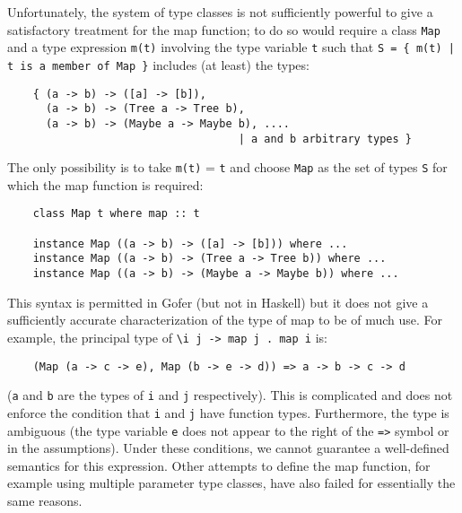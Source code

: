 Unfortunately, the system of type classes is not sufficiently powerful
to give a satisfactory treatment for the map function; to do so would
require a class \verb"Map" and a type expression \verb"m(t)" involving the type
variable \verb"t" such that \verb"S = { m(t) | t is a member of Map }" includes (at
least) the types:
\begin{verbatim}
    { (a -> b) -> ([a] -> [b]),
      (a -> b) -> (Tree a -> Tree b),
      (a -> b) -> (Maybe a -> Maybe b), ....
                                    | a and b arbitrary types }
\end{verbatim}
The only possibility is to take \verb"m(t)" = \verb"t" and choose \verb"Map" as the set of
types \verb"S" for which the map function is required:
\begin{verbatim}
    class Map t where map :: t

    instance Map ((a -> b) -> ([a] -> [b])) where ...
    instance Map ((a -> b) -> (Tree a -> Tree b)) where ...
    instance Map ((a -> b) -> (Maybe a -> Maybe b)) where ...
\end{verbatim}
This syntax is permitted in Gofer (but not in Haskell) but it does not
give a sufficiently accurate characterization of the type of map to be
of much use.  For example, the principal type of \verb"\i j -> map j . map i"
is:
\begin{verbatim}
    (Map (a -> c -> e), Map (b -> e -> d)) => a -> b -> c -> d
\end{verbatim}
(\verb"a" and \verb"b" are the types of \verb"i" and \verb"j" respectively).  This is complicated
and does not enforce the condition that \verb"i" and \verb"j" have function types.
Furthermore, the type is ambiguous (the type variable \verb"e" does not appear
to the right of the \verb"=>" symbol or in the assumptions).  Under these
conditions, we cannot guarantee a well-defined semantics for this
expression.  Other attempts to define the map function, for example
using multiple parameter type classes, have also failed for essentially
the same reasons.


